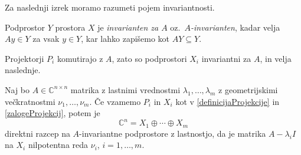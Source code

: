 \documentclass[mat1]{fmfdelo}
\newcommand{\C}{\mathbb C}
\begin{document}
Za naslednji izrek moramo razumeti pojem invariantnosti.
\begin{definicija}
    Podprostor $Y$ prostora $X$ je \emph{invarianten za $A$} oz.\ \emph{$A$-invarianten}, kadar velja $A y \in Y$ za vsak $y \in Y$, kar lahko zapišemo kot $A Y \subseteq Y$.
\end{definicija}
Projektorji $P_i$ komutirajo z $A$, zato so podprostori $X_i$ invariantni za $A$, in velja naslednje. 
\begin{izrek}\label{trditevSpektralniRazcep}
    Naj bo $A \in \C^{n \times n}$ matrika z lastnimi vrednostmi $\lambda_1, \ldots, \lambda_m$ z geometrijskimi večkratnostmi $\nu_1, \ldots, \nu_m$. Če vzamemo $P_i$ in $X_i$ kot v \eqref{definicijaProjekcije} in \eqref{zalogeProjekcij}, potem je
    \begin{equation}\label{eqSpektralniRazcep}
        \C^n = X_1 \oplus \cdots \oplus X_m
    \end{equation}
    direktni razcep na $A$-invariantne podprostore z lastnostjo, da je matrika $A - \lambda_i I$ na $X_i$ nilpotentna reda $\nu_i$, $i = 1, \ldots, m$.
\end{izrek}
\end{document}
